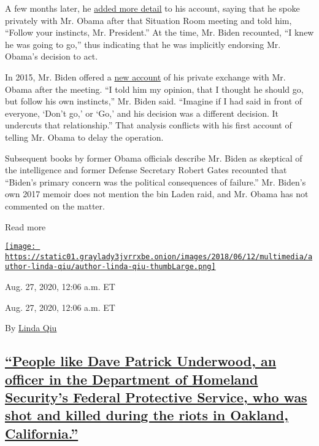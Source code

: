 A few months later, he
\href{http://www.nbcnews.com/id/47311900/ns/meet_the_press-transcripts/t/may-joe-biden-kelly-ayotte-diane-swonk-tom-brokaw-chuck-todd/\#.X0chN9NKjCB}{added
more detail} to his account, saying that he spoke privately with Mr.
Obama after that Situation Room meeting and told him, ``Follow your
instincts, Mr. President.'' At the time, Mr. Biden recounted, ``I knew
he was going to go,'' thus indicating that he was implicitly endorsing
Mr. Obama's decision to act.

In 2015, Mr. Biden offered a
\href{https://gwtoday.gwu.edu/joe-biden-and-walter-mondale-discuss-\%E2\%80\%98new-modern-vice-presidency\%E2\%80\%99}{new
account} of his private exchange with Mr. Obama after the meeting. ``I
told him my opinion, that I thought he should go, but follow his own
instincts,'' Mr. Biden said. ``Imagine if I had said in front of
everyone, `Don't go,' or `Go,' and his decision was a different
decision. It undercuts that relationship.'' That analysis conflicts with
his first account of telling Mr. Obama to delay the operation.

Subsequent books by former Obama officials describe Mr. Biden as
skeptical of the intelligence and former Defense Secretary Robert Gates
recounted that ``Biden's primary concern was the political consequences
of failure.'' Mr. Biden's own 2017 memoir does not mention the bin Laden
raid, and Mr. Obama has not commented on the matter.

Read more

\href{https://www.nytimes3xbfgragh.onion/by/linda-qiu}{\texttt{[image: https://static01.graylady3jvrrxbe.onion/images/2018/06/12/multimedia/author-linda-qiu/author-linda-qiu-thumbLarge.png]}}

Aug. 27, 2020, 12:06 a.m. ET

Aug. 27, 2020, 12:06 a.m. ET

By \href{https://www.nytimes3xbfgragh.onion/by/linda-qiu}{Linda Qiu}

\hypertarget{people-like-dave-patrick-underwood-an-officer-in-the-department-of-homeland-securitys-federal-protective-service-who-was-shot-and-killed-during-the-riots-in-oakland-california}{%
\subsection{\texorpdfstring{\protect\hyperlink{people-like-dave-patrick-underwood-an-officer-in-the-department-of-homeland-securitys-federal-protective-service-who-was-shot-an}{``People
like Dave Patrick Underwood, an officer in the Department of Homeland
Security's Federal Protective Service, who was shot and killed during
the riots in Oakland,
California.''}}{``People like Dave Patrick Underwood, an officer in the Department of Homeland Security's Federal Protective Service, who was shot and killed during the riots in Oakland, California.''}}\label{people-like-dave-patrick-underwood-an-officer-in-the-department-of-homeland-securitys-federal-protective-service-who-was-shot-and-killed-during-the-riots-in-oakland-california}}

